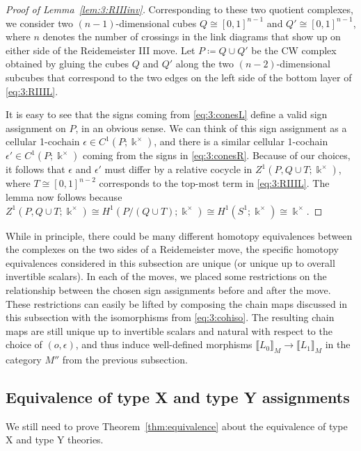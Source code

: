 \documentclass[12pt]{amsart}
\theoremstyle{definition}
\theoremstyle{plain}
\begin{document}
\begin{proof}[Proof of Lemma~\ref{lem:3:RIIIinv}]
Corresponding to these two quotient complexes, we consider two $(n-1)$-dimensional cubes $Q\cong[0,1]^{n-1}$ and $Q'\cong[0,1]^{n-1}$, where $n$ denotes the number of crossings in the link diagrams that show up on either side of the Reidemeister III move.
Let $P\coloneqq Q\cup Q'$ be the CW complex obtained by gluing the cubes $Q$ and $Q'$ along the two $(n-2)$-dimensional subcubes that correspond to the two edges on the left side of the bottom layer of  \eqref{eq:3:RIIIL}.

It is easy to see that the signs coming from \eqref{eq:3:conesL} define a valid sign assignment on $P$, in an obvious sense.
We can think of this sign assignment as a cellular 1-cochain $\epsilon\in C^1(P;\Bbbk^\times)$, and there is a similar
cellular 1-cochain $\epsilon'\in C^1(P;\Bbbk^\times)$ coming from the signs in \eqref{eq:3:conesR}.
Because of our choices, it follows that $\epsilon$ and $\epsilon'$ must differ by a relative cocycle
in $Z^1(P,Q\cup T;\Bbbk^\times)$, where $T\cong[0,1]^{n-2}$ corresponds to the top-most term in \eqref{eq:3:RIIIL}.
The lemma now follows because $Z^1(P,Q\cup T;\Bbbk^\times)\cong H^1(P/(Q\cup T);\Bbbk^\times)\cong H^1(S^1;\Bbbk^\times)\cong\Bbbk^\times$.
\end{proof}

While in principle, there could be many different homotopy equivalences between the complexes on the two sides of a Reidemeister move,
the specific homotopy equivalences considered in this subsection are unique (or unique up to overall invertible scalars).
In each of the moves, we placed some restrictions on the relationship between the chosen sign assignments before and after the move.
These restrictions can easily be lifted by composing the chain maps discussed in this subsection with the isomorphisms
from \eqref{eq:3:cohiso}. The resulting chain maps are still unique up to invertible scalars and natural with respect to
the choice of $(o,\epsilon)$, 
and thus induce well-defined morphisms $\llbracket L_0\rrbracket_M\rightarrow\llbracket L_1\rrbracket_M$ in the category $M''$ from
the previous subsection.

\subsection{Equivalence of type X and type Y assignments}\label{subs:XYequivalence}

We still need to prove Theorem~\ref{thm:equivalence} about the equivalence of type X and type Y theories. 
\end{document}
